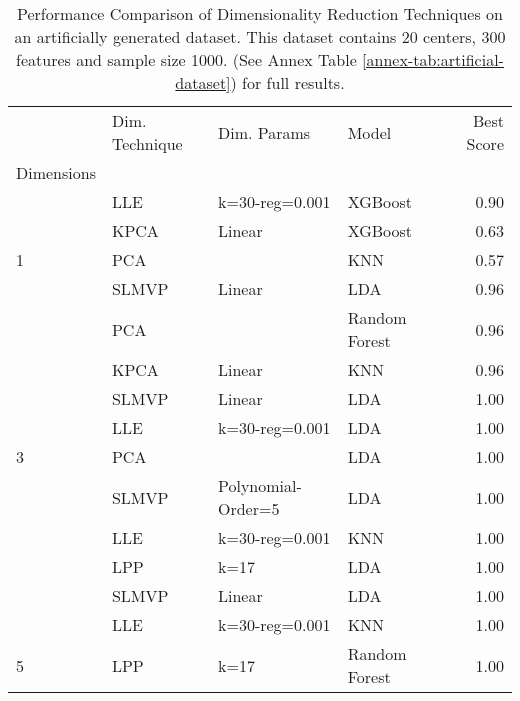 \begin{table}
    \begin{tabular}{llllr}
        \toprule
        {}                                      & Dim. Technique & Dim. Params        & Model         & Best Score \\
        Dimensions                              &                &                    &               &            \\
        \midrule
                                                & LLE            & k=30-reg=0.001     & XGBoost       & 0.90       \\
                                                & KPCA           & Linear             & XGBoost       & 0.63       \\
        \multirow{-3}{*}{1}                     & PCA            &                    & KNN           & 0.57       \\
        \rowcolor{lightgray}                    & SLMVP          & Linear             & LDA           & 0.96       \\
        \rowcolor{lightgray}                    & PCA            &                    & Random Forest & 0.96       \\
        \rowcolor{lightgray}\multirow{-3}{*}{2} & KPCA           & Linear             & KNN           & 0.96       \\
                                                & SLMVP          & Linear             & LDA           & 1.00       \\
                                                & LLE            & k=30-reg=0.001     & LDA           & 1.00       \\
        \multirow{-3}{*}{3}                     & PCA            &                    & LDA           & 1.00       \\
        \rowcolor{lightgray}                    & SLMVP          & Polynomial-Order=5 & LDA           & 1.00       \\
        \rowcolor{lightgray}                    & LLE            & k=30-reg=0.001     & KNN           & 1.00       \\
        \rowcolor{lightgray}\multirow{-3}{*}{4} & LPP            & k=17               & LDA           & 1.00       \\
                                                & SLMVP          & Linear             & LDA           & 1.00       \\
                                                & LLE            & k=30-reg=0.001     & KNN           & 1.00       \\
        \multirow{-3}{*}{5}                     & LPP            & k=17               & Random Forest & 1.00       \\
        \bottomrule
    \end{tabular}
    \caption{Performance Comparison of Dimensionality Reduction Techniques on an artificially generated dataset. This dataset contains 20 centers, 300 features and sample size 1000. (See Annex Table \ref{annex-tab:artificial-dataset}) for full results.}
    \label{tab:artificial-dataset}
\end{table}


